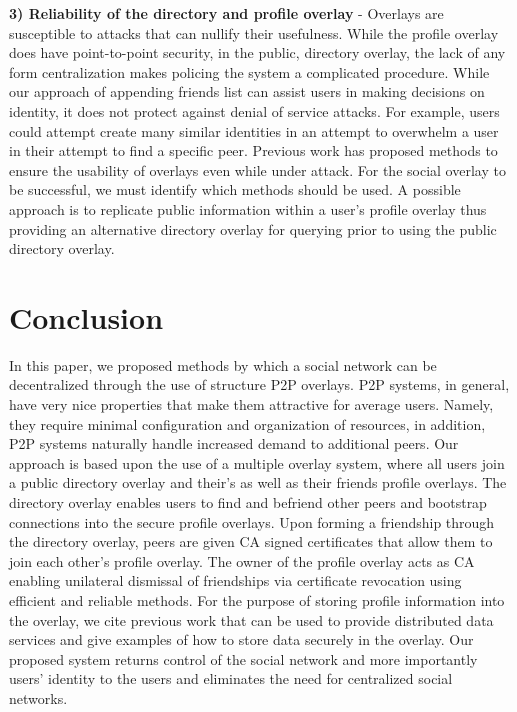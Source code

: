 \documentclass[conference]{IEEEtran}
\begin{document}
{\bf 3) Reliability of the directory and profile overlay} - Overlays are
susceptible to attacks that can nullify their usefulness.  While the profile
overlay does have point-to-point security, in the public, directory overlay,
the lack of any form centralization makes policing the system a complicated
procedure.  While our approach of appending friends list can assist users in
making decisions on identity, it does not protect against denial of service
attacks.  For example, users could attempt create many similar identities in
an attempt to overwhelm a user in their attempt to find a specific peer.
Previous work has proposed methods to ensure the usability of overlays even
while under attack.  For the social overlay to be successful, we must identify
which methods should be used. A possible approach is to replicate public
information within a user's profile overlay thus providing an alternative
directory overlay for querying prior to using the public directory overlay.

\section{Conclusion}
\label{conclusion}

In this paper, we proposed methods by which a social network can be
decentralized through the use of structure P2P overlays.  P2P systems, in
general, have very nice properties that make them attractive for average
users.  Namely, they require minimal configuration and organization of
resources, in addition, P2P systems naturally handle increased demand to
additional peers.  Our approach is based upon the use of a multiple overlay
system, where all users join a public directory overlay and their's as well as
their friends profile overlays.  The directory overlay enables users to find
and befriend other peers and bootstrap connections into the secure profile
overlays.  Upon forming a friendship through the directory overlay, peers are
given CA signed certificates that allow them to join each other's profile
overlay.  The owner of the profile overlay acts as CA enabling unilateral
dismissal of friendships via certificate revocation using efficient and
reliable methods.  For the purpose of storing profile information into the
overlay, we cite previous work that can be used to provide distributed data
services and give examples of how to store data securely in the overlay.  Our
proposed system returns control of the social network and more importantly
users' identity to the users and eliminates the need for centralized social
networks.

\small{


}
\end{document}
